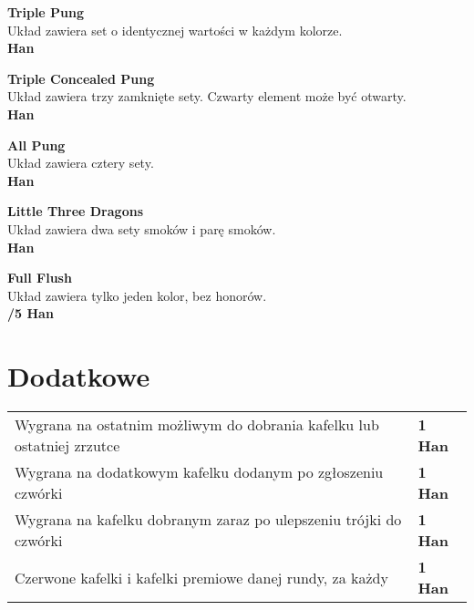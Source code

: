 \documentclass[12pt, a4paper]{article}
\newcommand{\han}[1]{\\ \textbf{\color{BrickRed}\link{#1 }\color{Black}Han}}
\newcommand{\chan}[2]{\\ \textbf{\color{PineGreen}\link{#1}\color{Black}/\color{BrickRed}#2 \color{Black}Han}}
\begin{document}
    \textbf{Triple Pung \\}
    Układ zawiera set o identycznej wartości w każdym kolorze. \han{2}

    \textbf{Triple Concealed Pung \\}
    Układ zawiera trzy zamknięte sety. Czwarty element może być otwarty. \han{2}

    \textbf{All Pung \\}
    Układ zawiera cztery sety. \han{2}

    \textbf{Little Three Dragons \\}
    Układ zawiera dwa sety smoków i parę smoków. \han{2}

    \textbf{Full Flush \\}
    Układ zawiera tylko jeden kolor, bez honorów. \chan{4}{5}


    \pagebreak
    \section*{Dodatkowe}
    \begin{table}[h!]
        \centering
        \begin{tabular}{p{11cm}p{2cm}}
            Wygrana na ostatnim możliwym do dobrania kafelku lub ostatniej zrzutce & \textbf{1 Han} \\[2em]
            Wygrana na dodatkowym kafelku dodanym po zgłoszeniu czwórki & \textbf{1 Han} \\[2em]
            Wygrana na kafelku dobranym zaraz po ulepszeniu trójki do czwórki & \textbf{1 Han} \\[2em]
            Czerwone kafelki i kafelki premiowe danej rundy, za każdy & \textbf{1 Han} \\[2em]
        \end{tabular}
    \end{table}
\end{document}
